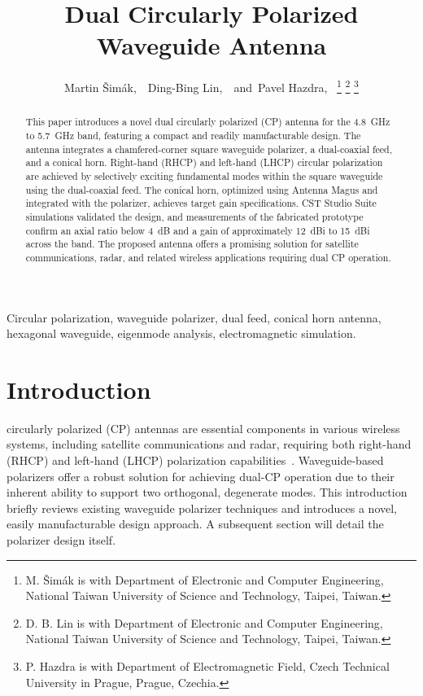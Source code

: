\documentclass[lettersize,journal]{IEEEtran}
\title{Dual Circularly Polarized Waveguide Antenna}
\author{Martin Šimák,~\IEEEmembership{Student Member,~IEEE,}~Ding-Bing Lin,~\IEEEmembership{Member,~IEEE,}~and~Pavel Hazdra,~\IEEEmembership{Member,~IEEE}%
\thanks{M. Šimák is with Department of Electronic and Computer Engineering, National Taiwan University of Science and Technology, Taipei, Taiwan.}%
\thanks{D. B. Lin is with Department of Electronic and Computer Engineering, National Taiwan University of Science and Technology, Taipei, Taiwan.}%
\thanks{P. Hazdra is with Department of Electromagnetic Field, Czech Technical University in Prague, Prague, Czechia.}%
}
\begin{document}
\maketitle

\begin{abstract}
    This paper introduces a novel dual circularly polarized (CP) antenna for the 4.8~GHz to 5.7~GHz band, featuring a compact and readily manufacturable design. The antenna integrates a chamfered-corner square waveguide polarizer, a dual-coaxial feed, and a conical horn. Right-hand (RHCP) and left-hand (LHCP) circular polarization are achieved by selectively exciting fundamental modes within the square waveguide using the dual-coaxial feed. The conical horn, optimized using Antenna Magus and integrated with the polarizer, achieves target gain specifications. CST Studio Suite simulations validated the design, and measurements of the fabricated prototype confirm an axial ratio below 4~dB and a gain of approximately 12~dBi to 15~dBi across the band. The proposed antenna offers a promising solution for satellite communications, radar, and related wireless applications requiring dual CP operation.
\end{abstract}

\begin{IEEEkeywords}
Circular polarization, waveguide polarizer, dual feed, conical horn antenna, hexagonal waveguide, eigenmode analysis, electromagnetic simulation.
\end{IEEEkeywords}

\section{Introduction}

 circularly polarized (CP) antennas are essential components in various wireless systems, including satellite communications and radar, requiring both right-hand (RHCP) and left-hand (LHCP) polarization capabilities~\cite{cite1, cite2}. Waveguide-based polarizers offer a robust solution for achieving dual-CP operation due to their inherent ability to support two orthogonal, degenerate modes. This introduction briefly reviews existing waveguide polarizer techniques and introduces a novel, easily manufacturable design approach. A subsequent section will detail the polarizer design itself.
\end{document}
